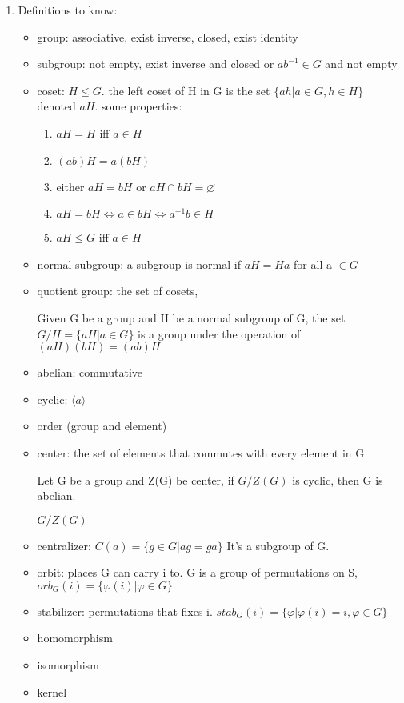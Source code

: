 \documentclass[11pt, oneside]{article}
\begin{document}
\newpage
\begin{enumerate}
\item Definitions to know:

\begin{itemize}
\item group: associative, exist inverse, closed, exist identity
\item subgroup: not empty, exist inverse and closed or $ab^{-1}\in G$ and not empty
\item coset: $H\leq G$. the left coset of H in G is the set $\{ah|a\in G, h\in H\}$ denoted $aH$. some properties: \begin{enumerate}
    \item $aH=H $ iff $a\in H$
    \item $(ab)H=a(bH)$
    \item either $aH=bH$ or $aH\cap bH=\varnothing$
    \item $aH=bH\Longleftrightarrow a\in bH \Longleftrightarrow a^{-1}b \in H$
    \item $aH\leq G$ iff $a\in H$
\end{enumerate}
\item normal subgroup:  a subgroup is normal if $aH=Ha$ for all a $\in G$
\item quotient group: the set of cosets, 

Given G be a group and H be a normal subgroup of G, the set $G/H=\{aH|a\in G\}$ is a group under the operation of $(aH)(bH)=(ab)H$
\item abelian: commutative
\item cyclic: $\langle a \rangle$
\item order (group and element)
\item center: the set of elements that commutes with every element in G

Let G be a group and Z(G) be center, if $G/Z(G)$ is cyclic, then G is abelian.

$G/Z(G)$
\item centralizer: $C(a)=\{g\in G|ag=ga\}$ It's a subgroup of G.
\item orbit: places G can carry i to. G is a group of permutations on S, $orb_G(i)=\{\varphi (i)|\varphi\in G\}$
\item stabilizer: permutations that fixes i. $stab_G(i)=\{\varphi|\varphi(i)=i, \varphi \in G\}$
\item homomorphism
\item isomorphism
\item kernel
\end{itemize}









\end{enumerate}
\end{document}
